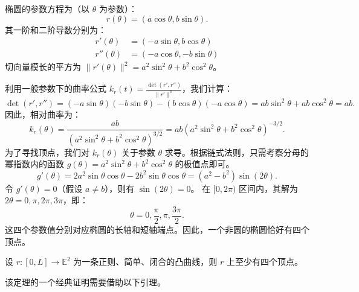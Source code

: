 \documentclass[lang=cn,10pt,thmcnt=section]{elegantbook}
\begin{document}
\begin{example}[椭圆的顶点]
    椭圆的参数方程为（以 $\theta$ 为参数）：
    \[
    r(\theta) = (a \cos \theta, b \sin \theta).
    \]
    其一阶和二阶导数分别为：
    \begin{align*}
        r'(\theta) &= (-a \sin \theta, b \cos \theta) \\
        r''(\theta) &= (-a \cos \theta, -b \sin \theta)
    \end{align*}
    切向量模长的平方为 $\|r'(\theta)\|^2 = a^2 \sin^2 \theta + b^2 \cos^2 \theta$。
    
    利用一般参数下的曲率公式 $k_r(t) = \frac{\det(r', r'')}{\|r'\|^3}$，我们计算：
    \[
    \det(r', r'') = (-a \sin \theta)(-b \sin \theta) - (b \cos \theta)(-a \cos \theta) = ab\sin^2\theta + ab\cos^2\theta = ab.
    \]
    因此，相对曲率为：
    \[
    k_r(\theta) = \frac{ab}{\left( a^2 \sin^2 \theta + b^2 \cos^2 \theta \right)^{3/2}} = ab \left( a^2 \sin^2 \theta + b^2 \cos^2 \theta \right)^{-3/2}.
    \]
    为了寻找顶点，我们对 $k_r(\theta)$ 关于参数 $\theta$ 求导。根据链式法则，只需考察分母的幂指数内的函数 $g(\theta) = a^2 \sin^2 \theta + b^2 \cos^2 \theta$ 的极值点即可。
    \[
    g'(\theta) = 2a^2 \sin\theta \cos\theta - 2b^2 \sin\theta \cos\theta = (a^2 - b^2) \sin(2\theta).
    \]
    令 $g'(\theta)=0$（假设 $a \neq b$），则有 $\sin(2\theta) = 0$。
    在 $[0, 2\pi)$ 区间内，其解为 $2\theta = 0, \pi, 2\pi, 3\pi$，即：
    \[
    \theta = 0, \frac{\pi}{2}, \pi, \frac{3\pi}{2}.
    \]
    这四个参数值分别对应椭圆的长轴和短轴端点。因此，一个非圆的椭圆恰好有四个顶点。
\end{example}
\begin{theorem}
    设 $r: [0, L] \to \mathbb{E}^2$ 为一条正则、简单、闭合的凸曲线，则 $r$ 上至少有四个顶点。
\end{theorem}

该定理的一个经典证明需要借助以下引理。
\end{document}
